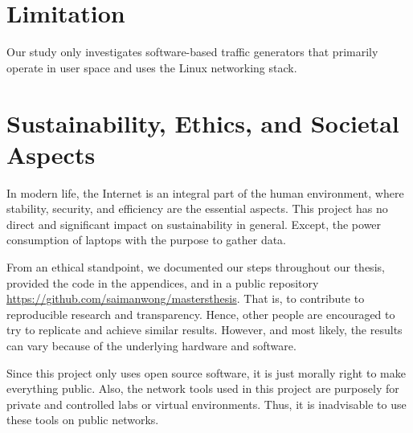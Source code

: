 \section{Limitation}
Our study only investigates software-based traffic generators that primarily operate in user space and uses the Linux networking stack.

%
%
\section{Sustainability, Ethics, and Societal Aspects}
In modern life, the Internet is an integral part of the human environment, where stability, security, and efficiency are the essential aspects.
This project has no direct and significant impact on sustainability in general.
Except, the power consumption of laptops with the purpose to gather data.


\skippara From an ethical standpoint, we documented our steps throughout our thesis, provided the code in the appendices, and in a public repository \url{https://github.com/saimanwong/mastersthesis}.
That is, to contribute to reproducible research and transparency.
Hence, other people are encouraged to try to replicate and achieve similar results.
However, and most likely, the results can vary because of the underlying hardware and software.

\skippara Since this project only uses open source software, it is just morally right to make everything public.
Also, the network tools used in this project are purposely for private and controlled labs or virtual environments.
Thus, it is inadvisable to use these tools on public networks.
